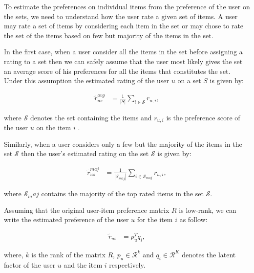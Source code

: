 
To estimate the preferences on individual items from the preference of the user on the
sets, we need to understand how the user rate a given set of items. A user may
rate a set of items by considering each item in the set or may chose to rate
the set of the items based on few but majority of the items in the set.

In the first case, when a user consider all the items in the set before 
assigning a rating to a set then we can safely assume that the user most likely
gives the set an average score of his preferences for all the items that constitutes 
the set. Under this assumption the estimated rating of the user $u$ on a 
set $S$ is given by: 

\begin{equation} \label{avgSetEq}
  \begin{split}
    \tilde{r}^{avg}_{us} &= \frac{1}{|S|} \sum_{i \in \mathcal{S}} r_{u,i},
  \end{split}
\end{equation}

where $\mathcal{S}$ denotes the set containing the items and $r_{u,i}$ is the
preference score of the user $u$ on the item $i$ .

Similarly, when a user considers only a few but the majority of the items in
the set $\mathcal{S}$ then the user's estimated rating on the set $\mathcal{S}$ is given by:

\begin{equation} \label{majSetEq}
  \begin{split}
    \tilde{r}^{maj}_{us} &= \frac{1}{|\mathcal{S}_{maj}|} \sum_{i \in
    \mathcal{S}_{maj}} r_{u,i},
  \end{split}
\end{equation}

where $\mathcal{S}_maj$ contains the majority of the top rated items in the set 
$\mathcal{S}$.


Assuming that the original user-item preference matrix $R$ is low-rank, we can write
the estimated preference of the user $u$ for the item $i$ as follow:

\begin{equation} 
  \begin{split}
    \tilde{r}_{ui} &= p_u^Tq_i, 
  \end{split}
\end{equation}

where, $k$ is the rank of the matrix $R$, $p_u \in \mathcal{R}^k$ and $q_i \in \mathcal{R}^K$ denotes the latent factor of the user $u$ and the item $i$ respectively.  

